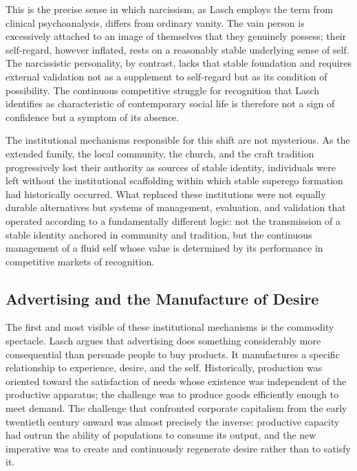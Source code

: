 \documentclass[12pt]{memoir}
\begin{document}
This is the precise sense in which narcissism, as Lasch employs the term from clinical
psychoanalysis, differs from ordinary vanity. The vain person is excessively attached to an
image of themselves that they genuinely possess; their self-regard, however inflated, rests on
a reasonably stable underlying sense of self. The narcissistic personality, by contrast, lacks
that stable foundation and requires external validation not as a supplement to self-regard but
as its condition of possibility. The continuous competitive struggle for recognition that Lasch
identifies as characteristic of contemporary social life is therefore not a sign of confidence
but a symptom of its absence.\citep[34--38]{lasch1979}

The institutional mechanisms responsible for this shift are not mysterious. As the extended
family, the local community, the church, and the craft tradition progressively lost their
authority as sources of stable identity, individuals were left without the institutional
scaffolding within which stable superego formation had historically occurred. What replaced
these institutions were not equally durable alternatives but systems of management,
evaluation, and validation that operated according to a fundamentally different logic: not the
transmission of a stable identity anchored in community and tradition, but the continuous
management of a fluid self whose value is determined by its performance in competitive markets
of recognition.

\subsection{Advertising and the Manufacture of Desire}

The first and most visible of these institutional mechanisms is the commodity spectacle. Lasch
argues that advertising does something considerably more consequential than persuade people to
buy products. It manufactures a specific relationship to experience, desire, and the self.
Historically, production was oriented toward the satisfaction of needs whose existence was
independent of the productive apparatus; the challenge was to produce goods efficiently enough
to meet demand. The challenge that confronted corporate capitalism from the early twentieth
century onward was almost precisely the inverse: productive capacity had outrun the ability of
populations to consume its output, and the new imperative was to create and continuously
regenerate desire rather than to satisfy it.\citep[72]{lasch1979}
\end{document}
